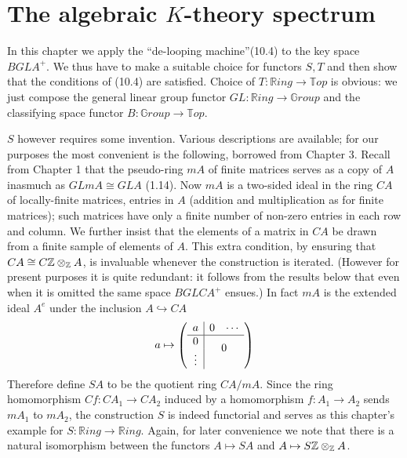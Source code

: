 \chapter{The algebraic $K$-theory spectrum} %
\label{cha:11the_algebraic_k_theory_spectrum}
In this chapter we apply the ``de-looping machine''(10.4) to the key space $BGLA^+$. We thus have to make a suitable choice for functors $S, T$ and then show that the conditions of (10.4) are satisfied. Choice of $T \colon   \mathbb{R}ing \longrightarrow \mathbb{T}op$ is obvious: we just compose the general linear group functor $GL \colon   \mathbb{R}ing \longrightarrow \mathbb{G}roup$ and the classifying space functor $B \colon   \mathbb{G}roup \longrightarrow \mathbb{T}op$.

$S$ however requires some invention. Various descriptions are available; for our purposes the most convenient is the following, borrowed from Chapter 3. Recall from Chapter 1 that the pseudo-ring $mA$ of finite matrices serves as a copy of $A$ inasmuch as $GLmA \cong GLA$ (1.14). Now $mA$ is a two-sided ideal in the ring $CA$ of locally-finite matrices, entries in $A$ (addition and multiplication as for finite matrices); such matrices have only a finite number of non-zero entries in each row and column. We further insist that the elements of a matrix in $CA$ be drawn from a finite sample of elements of $A$. This extra condition, by ensuring that $CA\cong C\mathbb{Z} \otimes_{\mathbb{Z}} A$, is invaluable whenever the construction is iterated. (However for present purposes it is quite redundant: it follows from the results below that even when it is omitted the same space $BGLCA^+$ ensues.) In fact $mA$ is the extended ideal $A^e$ under the inclusion $A \hookrightarrow CA$
\[a\mapsto \left(
\begin{array}{c|cc}
 a& 0& \cdots\\
 \hline
0 & \multicolumn{2}{c}{\multirow{2}{*}{$0$}} \\
\vdots&  &\\
\end{array}\right)\]
Therefore define $SA$ to be the quotient ring $CA/mA$. Since the ring homomorphism $Cf \colon   CA_1\longrightarrow CA_2$ induced by a homomorphism $f\colon   A_1 \longrightarrow A_2$ sends $mA_1$ to $mA_2$, the construction $S$ is indeed functorial and serves as this chapter's example for $S \colon   \mathbb{R}ing \longrightarrow \mathbb{R}ing$. Again, for later convenience we note that there is a natural isomorphism between the functors $A \mapsto SA$ and
$A\mapsto S\mathbb{Z} \otimes_{\mathbb{Z}} A$.

